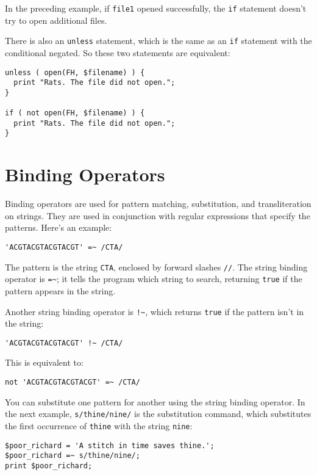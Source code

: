In the preceding example, if \verb|file1| opened successfully, the \verb|if| statement doesn't try to open additional files.

There is also an \verb|unless| statement, which is the same as an \verb|if| statement with the conditional negated. So these two statements are equivalent:

\begin{lstlisting}
unless ( open(FH, $filename) ) {
  print "Rats. The file did not open.";
}

if ( not open(FH, $filename) ) {
  print "Rats. The file did not open.";
}
\end{lstlisting}

\section{Binding Operators}
Binding operators are used for pattern matching, substitution, and transliteration on strings. They are used in conjunction with regular expressions that specify the patterns. Here's an example:

\begin{lstlisting}
'ACGTACGTACGTACGT' =~ /CTA/
\end{lstlisting}

The pattern is the string \verb|CTA|, enclosed by forward slashes \verb|//|. The string binding operator is \verb|=~|; it tells the program which string to search, returning \verb|true| if the pattern appears in the string.

Another string binding operator is \verb|!~|, which returns \verb|true| if the pattern isn't in the string:

\begin{lstlisting}
'ACGTACGTACGTACGT' !~ /CTA/
\end{lstlisting}

This is equivalent to:

\begin{lstlisting}
not 'ACGTACGTACGTACGT' =~ /CTA/
\end{lstlisting}

You can substitute one pattern for another using the string binding operator. In the next example, \verb|s/thine/nine/| is the substitution command, which substitutes the first occurrence of \verb|thine| with the string \verb|nine|:

\begin{lstlisting}
$poor_richard = 'A stitch in time saves thine.';
$poor_richard =~ s/thine/nine/;
print $poor_richard;
\end{lstlisting}

